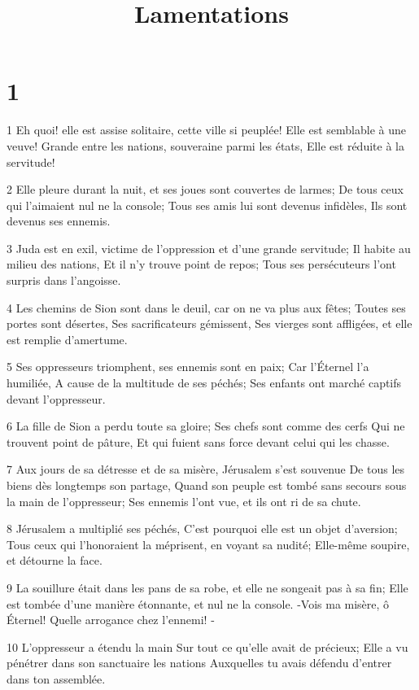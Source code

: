 

\title{Lamentations}


\chapter{1}

\par 1 Eh quoi! elle est assise solitaire, cette ville si peuplée! Elle est semblable à une veuve! Grande entre les nations, souveraine parmi les états, Elle est réduite à la servitude!
\par 2 Elle pleure durant la nuit, et ses joues sont couvertes de larmes; De tous ceux qui l'aimaient nul ne la console; Tous ses amis lui sont devenus infidèles, Ils sont devenus ses ennemis.
\par 3 Juda est en exil, victime de l'oppression et d'une grande servitude; Il habite au milieu des nations, Et il n'y trouve point de repos; Tous ses persécuteurs l'ont surpris dans l'angoisse.
\par 4 Les chemins de Sion sont dans le deuil, car on ne va plus aux fêtes; Toutes ses portes sont désertes, Ses sacrificateurs gémissent, Ses vierges sont affligées, et elle est remplie d'amertume.
\par 5 Ses oppresseurs triomphent, ses ennemis sont en paix; Car l'Éternel l'a humiliée, A cause de la multitude de ses péchés; Ses enfants ont marché captifs devant l'oppresseur.
\par 6 La fille de Sion a perdu toute sa gloire; Ses chefs sont comme des cerfs Qui ne trouvent point de pâture, Et qui fuient sans force devant celui qui les chasse.
\par 7 Aux jours de sa détresse et de sa misère, Jérusalem s'est souvenue De tous les biens dès longtemps son partage, Quand son peuple est tombé sans secours sous la main de l'oppresseur; Ses ennemis l'ont vue, et ils ont ri de sa chute.
\par 8 Jérusalem a multiplié ses péchés, C'est pourquoi elle est un objet d'aversion; Tous ceux qui l'honoraient la méprisent, en voyant sa nudité; Elle-même soupire, et détourne la face.
\par 9 La souillure était dans les pans de sa robe, et elle ne songeait pas à sa fin; Elle est tombée d'une manière étonnante, et nul ne la console. -Vois ma misère, ô Éternel! Quelle arrogance chez l'ennemi! -
\par 10 L'oppresseur a étendu la main Sur tout ce qu'elle avait de précieux; Elle a vu pénétrer dans son sanctuaire les nations Auxquelles tu avais défendu d'entrer dans ton assemblée.
